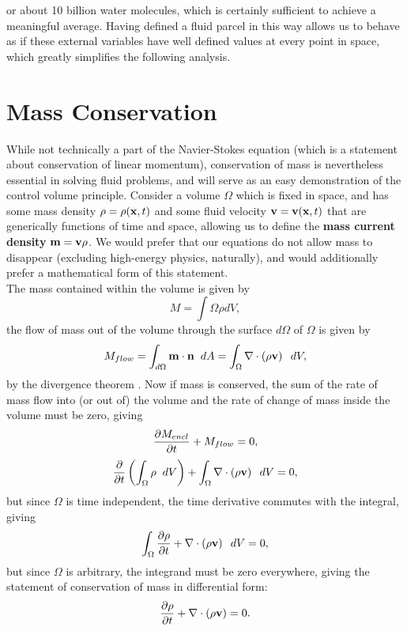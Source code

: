 or about 10 billion water molecules, which is certainly sufficient to achieve a meaningful average. Having defined a fluid parcel in this way allows us to behave as if these external variables have well defined values at every point in space, which greatly simplifies the following analysis. 

\section{Mass Conservation}
While not technically a part of the Navier-Stokes equation (which is a statement about conservation of linear momentum), conservation of mass is nevertheless essential in solving fluid problems, and will serve as an easy demonstration of the control volume principle. Consider a volume $\Omega$ which is fixed in space, and has some mass density $\rho = \rho(\mathbf{x},t)$ and some fluid velocity $\mathbf{v} = \mathbf{v}(\mathbf{x} ,t)$ that are generically functions of time and space, allowing us to define the {\bf mass current density} $\mathbf{m} = \mathbf{v}\rho$. We would prefer that our equations do not allow mass to disappear (excluding high-energy physics, naturally), and would additionally prefer a mathematical form of this statement. \\

The mass contained within the volume is given by 
\begin{equation}
M = \int{\Omega}{}{\rho}{dV},
\end{equation}
the flow of mass out of the volume through the surface $d\Omega$ of $\Omega$ is given by 
\begin{equation}
M_{flow} = \int{d\Omega}{}{\Vector{m}\cdot\Vector{n}}{dA} = \int{\Omega}{}{\Div{\paren{\rho\Vector{v}}}}{dV},
\end{equation}
by the divergence theorem .  Now if mass is conserved, the sum of the rate of mass flow into (or out of) the volume and the rate of change of mass inside the volume must be zero, giving
\begin{equation}
\pder{1}{M_{encl}}{t} + M_{flow} = 0,
\end{equation}
\begin{equation}
\pder{1}{}{t}\paren{\int{\Omega}{}{\rho}{dV}} + \int{\Omega}{}{\Div{\paren{\rho\Vector{v}}}}{dV} =0,
\end{equation}
but since $\Omega$ is time independent, the time derivative commutes with the integral, giving 
\begin{equation}
\int{\Omega}{}{\pder{1}{\rho}{t} + \Div{\paren{\rho\Vector{v}}}}{dV} = 0,
\end{equation}
but since $\Omega$ is arbitrary, the integrand must be zero everywhere, giving the statement of conservation of mass in differential form:
\begin{equation}\label{eq:consMassFull}
\pder{1}{\rho}{t} + \Div{\paren{\rho\Vector{v}} }= 0.
\end{equation}

